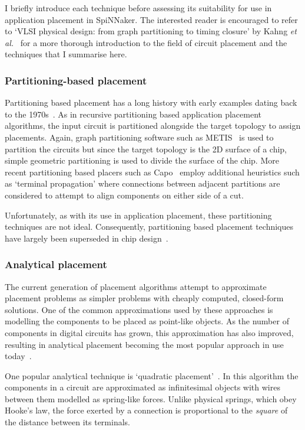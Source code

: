 			I briefly introduce each technique before assessing its suitability for
			use in application placement in SpiNNaker. The interested reader is
			encouraged to refer to `VLSI physical design: from graph partitioning to
			timing closure' by Kahng \emph{et al.}~\cite{kahng11} for a more thorough
			introduction to the field of circuit placement and the techniques that I
			summarise here.
			
			\subsubsection{Partitioning-based placement}
				
				Partitioning based placement has a long history with early examples
				dating back to the 1970s~\cite{breuer77}. As in recursive partitioning
				based application placement algorithms, the input circuit is
				partitioned alongside the target topology to assign placements. Again,
				graph partitioning software such as METIS~\cite{karypis98} is used to
				partition the circuits but since the target topology is the 2D surface
				of a chip, simple geometric partitioning is used to divide the surface
				of the chip. More recent partitioning based placers such as
				Capo~\cite{roy05} employ additional heuristics such as `terminal
				propagation' where connections between adjacent partitions are
				considered to attempt to align components on either side of a cut.
				
				Unfortunately, as with its use in application placement, these
				partitioning techniques are not ideal.  Consequently, partitioning
				based placement techniques have largely been superseded in chip
				design~\cite{markov15}.
			
			\subsubsection{Analytical placement}
				
				The current generation of placement algorithms attempt to approximate
				placement problems as simpler problems with cheaply computed,
				closed-form solutions. One of the common approximations used by these
				approaches is modelling the components to be placed as point-like
				objects. As the number of components in digital circuits has grown,
				this approximation has also improved, resulting in analytical placement
				becoming the most popular approach in use today~\cite{markov15}.
				
				One popular analytical technique is `quadratic
				placement'~\cite{kahng11,spindler08}. In this algorithm the components
				in a circuit are approximated as infinitesimal objects with wires
				between them modelled as spring-like forces. Unlike physical springs,
				which obey Hooke's law, the force exerted by a connection is
				proportional to the \emph{square} of the distance between its
				terminals.
				

